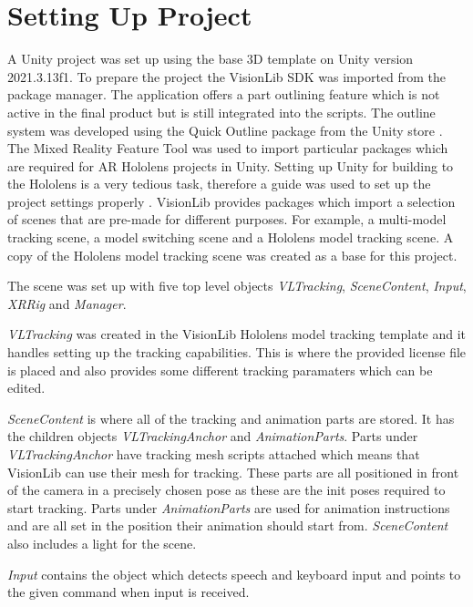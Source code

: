 \documentclass{l4proj}
\begin{document}
\section{Setting Up Project}

A Unity project was set up using the base 3D template on Unity version 2021.3.13f1. To prepare the project the VisionLib SDK was imported from the package manager. The application offers a part outlining feature which is not active in the final product but is still integrated into the scripts. The outline system was developed using the Quick Outline package from the Unity store \citep{nolet_quick_2022}. The Mixed Reality Feature Tool \citep{kerawala_welcome_2022} was used to import particular packages which are required for AR Hololens projects in Unity. Setting up Unity for building to the Hololens is a very tedious task, therefore a guide was used to set up the project settings properly \citep{qianw211_unity_2022}. VisionLib provides packages which import a selection of scenes that are pre-made for different purposes. For example, a multi-model tracking scene, a model switching scene and a Hololens model tracking scene. A copy of the Hololens model tracking scene was created as a base for this project.

The scene was set up with five top level objects \textit{VLTracking}, \textit{SceneContent}, \textit{Input}, \textit{XRRig} and \textit{Manager}.

\textit{VLTracking} was created in the VisionLib Hololens model tracking template and it handles setting up the tracking capabilities. This is where the provided license file is placed and also provides some different tracking paramaters which can be edited.

\textit{SceneContent} is where all of the tracking and animation parts are stored. It has the children objects \textit{VLTrackingAnchor} and \textit{AnimationParts}. Parts under \textit{VLTrackingAnchor} have tracking mesh scripts attached which means that VisionLib can use their mesh for tracking. These parts are all positioned in front of the camera in a precisely chosen pose as these are the init poses required to start tracking. Parts under \textit{AnimationParts} are used for animation instructions and are all set in the position their animation should start from. \textit{SceneContent} also includes a light for the scene.

\textit{Input} contains the object which detects speech and keyboard input and points to the given command when input is received.
\end{document}
